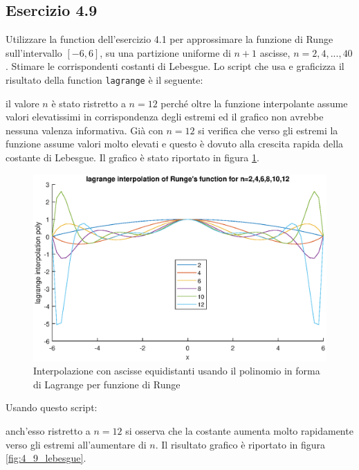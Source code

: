 	\subsection {Esercizio 4.9}
	
Utilizzare la function dell'esercizio 4.1 per approssimare la funzione di Runge sull'intervallo $[-6,6]$, su una partizione uniforme di $n+1$ ascisse, $n= 2,4, ... ,40$. Stimare le corrispondenti costanti di Lebesgue.
\PP
Lo script che usa e graficizza il risultato della function \lstinline{lagrange} è il seguente:

il valore $n$ è stato ristretto a $n=12$ perché oltre la funzione interpolante assume valori elevatissimi in corrispondenza degli estremi ed il grafico non avrebbe nessuna valenza informativa. Già con $n=12$ si verifica che verso gli estremi la funzione assume valori molto elevati e questo è dovuto alla crescita rapida della costante di Lebesgue. 
Il grafico è stato riportato in figura \ref{4_9_lagrange_interpolation}.\\
\begin{figure}[h!]\label{4_9_lagrange_interpolation}
    \centering
    \includegraphics[scale=0.5]{./capitolo_4/exercise_4_9}
    \caption{Interpolazione con ascisse equidistanti usando il polinomio in forma di Lagrange per funzione di Runge}
\end{figure}
Usando questo script:

anch'esso ristretto a $n=12$ si osserva che la costante aumenta molto rapidamente verso gli estremi all'aumentare di $n$.
Il risultato grafico è riportato in figura \ref{fig:4_9_lebesgue}.\\
